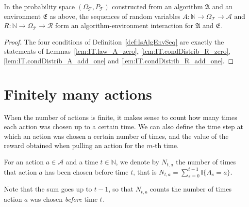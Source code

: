\begin{theorem}\label{thm:isAlgEnvSeq_trajMeasure}
  \leanok
In the probability space $(\Omega_{\mathcal{T}}, P_{\mathcal{T}})$ constructed from an algorithm $\mathfrak{A}$ and an environment $\mathfrak{E}$ as above, the sequences of random variables $A : \mathbb{N} \to \Omega_{\mathcal{T}} \to \mathcal{A}$ and $R : \mathbb{N} \to \Omega_{\mathcal{T}} \to \mathcal{R}$ form an algorithm-environment interaction for $\mathfrak{A}$ and $\mathfrak{E}$.
\end{theorem}

\begin{proof}\leanok
The four conditions of Definition~\ref{def:IsAlgEnvSeq} are exactly the statements of Lemmas~\ref{lem:IT.law_A_zero}, \ref{lem:IT.condDistrib_R_zero}, \ref{lem:IT.condDistrib_A_add_one} and \ref{lem:IT.condDistrib_R_add_one}.
\end{proof}



\section{Finitely many actions}

When the number of actions is finite, it makes sense to count how many times each action was chosen up to a certain time.
We can also define the time step at which an action was chosen a certain number of times, and the value of the reward obtained when pulling an action for the $m$-th time.

\begin{definition}\label{def:pullCount}
  \leanok
For an action $a \in \mathcal{A}$ and a time $t \in \mathbb{N}$, we denote by $N_{t,a}$ the number of times that action $a$ has been chosen before time $t$, that is $N_{t,a} = \sum_{s=0}^{t-1} \mathbb{I}\{A_s = a\}$.
\end{definition}

Note that the sum goes up to $t-1$, so that $N_{t,a}$ counts the number of times action $a$ was chosen \emph{before} time $t$.


